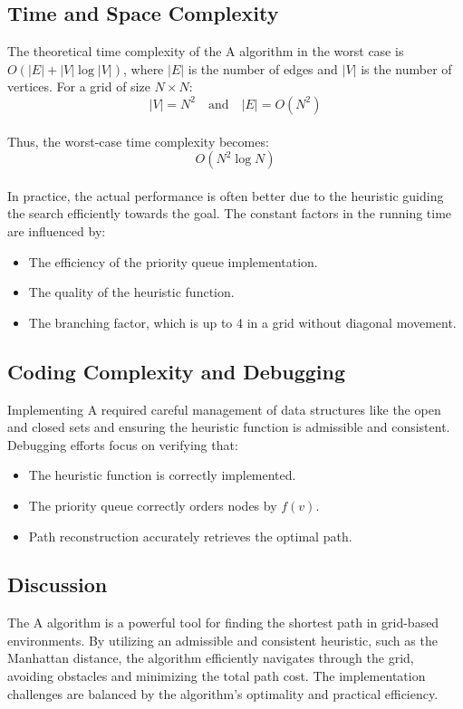 \documentclass[12pt]{article}
\begin{document}
\subsection{Time and Space Complexity}
The theoretical time complexity of the A\* algorithm in the worst case is \( O(|E| + |V|\log |V|) \), where \( |E| \) is the number of edges and \( |V| \) is the number of vertices. For a grid of size \( N \times N \):
\[
|V| = N^2 \quad \text{and} \quad |E| = O(N^2)
\]
\\
\noindent Thus, the worst-case time complexity becomes:
\[
O(N^2 \log N)
\]
\\
\noindent In practice, the actual performance is often better due to the heuristic guiding the search efficiently towards the goal. The constant factors in the running time are influenced by:
\begin{itemize}
    \item The efficiency of the priority queue implementation.
    \item The quality of the heuristic function.
    \item The branching factor, which is up to 4 in a grid without diagonal movement.
\end{itemize}

\subsection{Coding Complexity and Debugging}
Implementing A\* required careful management of data structures like the open and closed sets and ensuring the heuristic function is admissible and consistent. Debugging efforts focus on verifying that:
\begin{itemize}
    \item The heuristic function is correctly implemented.
    \item The priority queue correctly orders nodes by \( f(v) \).
    \item Path reconstruction accurately retrieves the optimal path.
\end{itemize}

\subsection{Discussion}
The A\* algorithm is a powerful tool for finding the shortest path in grid-based environments. By utilizing an admissible and consistent heuristic, such as the Manhattan distance, the algorithm efficiently navigates through the grid, avoiding obstacles and minimizing the total path cost. The implementation challenges are balanced by the algorithm's optimality and practical efficiency.
\newpage
\end{document}
